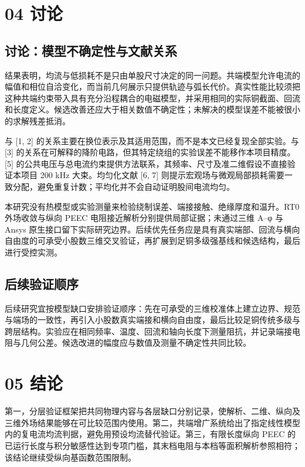 \documentclass[journal,10pt]{IEEEtran}
\begin{document}
\section*{04 讨论}
\hypertarget{chapter-04}{}
\subsection*{讨论：模型不确定性与文献关系}
\hypertarget{04.discussion.heading}{}
结果表明，均流与低损耗不是只由单股尺寸决定的同一问题。共端模型允许电流的幅值和相位自洽变化，而当前几何展示只提供轨迹与弧长代价。真实性能比较须把这种共端约束带入具有充分沿程耦合的电磁模型，并采用相同的实际铜截面、回流和长度定义。候选改善还应大于相关数值不确定性；未解决的模型误差不能被很小的求解残差抵消。


与 [1, 2] 的关系主要在换位表示及其适用范围，而不是本文已经复现全部实验。与 [3] 的关系在可解释的降阶电路，但其特定绕组的实验误差不能移作本项目精度。[5] 的公共电压与总电流约束提供方法联系，其频率、尺寸及准二维假设不直接验证本项目 200 kHz 大束。均匀化文献 [6, 7] 则提示宏观场与微观局部损耗需要一致分配，避免重复计数；平均化并不会自动证明股间电流均匀。


本研究没有热模型或实验测量来检验绕制误差、端接接触、绝缘厚度和温升。RT0 外场收敛与纵向 PEEC 电阻接近解析分别提供局部证据；未通过三维 A–φ 与 Ansys 原生接口留下实际研究边界。后续优先任务应是具有真实端部、回流与横向自由度的可承受小股数三维交叉验证，再扩展到足铜多级强基线和候选结构，最后进行受控实测。


\subsection*{后续验证顺序}
\hypertarget{04.recommendations.heading}{}
后续研究宜按模型缺口安排验证顺序：先在可承受的三维校准体上建立边界、规范与端场的一致性，再引入小股数真实端接和横向自由度，最后比较足铜传统多级与跨层结构。实验应在相同频率、温度、回流和轴向长度下测量阻抗，并记录端接电阻与几何公差。候选改进的幅度应与数值及测量不确定性共同比较。


\FloatBarrier
\section*{05 结论}
\hypertarget{chapter-05}{}
第一，分层验证框架把共同物理内容与各层缺口分别记录，使解析、二维、纵向及三维外场结果能够在可比较范围内使用。第二，共端增广系统给出了指定线性模型内的复电流均流判据，避免用预设均流替代验证。第三，有限长度纵向 PEEC 的已运行长度与积分敏感性达到专项门槛，其末档电阻与本档等面积解析参照相符；该结论继续受纵向基函数范围限制。
\end{document}
